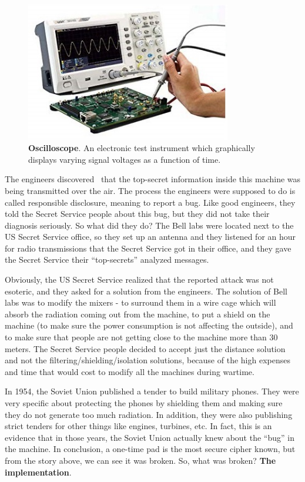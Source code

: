 \begin{figure}
    \centering
    \includegraphics[width=0.8\textwidth]{images/ch1_Intro/oscilloscope.jpg}
    \caption{\textbf{Oscilloscope}. An electronic test instrument which graphically displays varying signal voltages as a function of time.}
    \label{fig:Oscillo}
\end{figure}

The engineers discovered~\cite{NSAsecret} that the top-secret information inside
this machine was being transmitted over the air. The process the engineers were
supposed to do is called responsible disclosure, meaning to report a bug. Like
good engineers, they told the Secret Service people about this bug, but they
did not take their diagnosis seriously. So what did they do? The Bell labs were
located next to the US Secret Service office, so they set up an antenna and
they listened for an hour for radio transmissions that the Secret Service got in
their office, and they gave the Secret Service their ``top-secrets'' analyzed
messages.

Obviously, the US Secret Service realized that the reported attack was not
esoteric, and they asked for a solution from the engineers. The solution of Bell
labs was to modify the mixers - to surround them in a wire cage which will
absorb the radiation coming out from the machine, to put a shield on the
machine (to make sure the power consumption is not affecting the outside), and
to make sure that people are not getting close to the machine more than 30
meters. The Secret Service people decided to accept just the distance solution
and not the filtering/shielding/isolation solutions, because of the high
expenses and time that would cost to modify all the machines during wartime.

In 1954, the Soviet Union published a tender to build military phones. They were
very specific about protecting the phones by shielding them and making sure they
do not generate too much radiation. In addition, they were also publishing strict tenders for other things like engines, turbines, etc. In fact, this is an evidence that in those years, the Soviet Union actually knew about the ``bug'' in the machine.
In conclusion, a one-time pad is the most secure cipher known, but from
the story above, we can see it was broken. So, what was broken? \textbf{The
implementation}.


